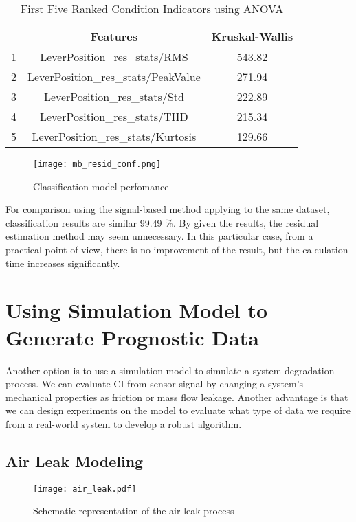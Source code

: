 \begin{table}[h!]
    \centering
    \begin{tabular}{|c|c|c|}
        \hline
          &        Features               & Kruskal-Wallis \\ \hline
        1 &   LeverPosition\_res\_stats/RMS	    & 543.82 \\ \hline  
        2 &   LeverPosition\_res\_stats/PeakValue	& 271.94 \\ \hline  
        3 &   LeverPosition\_res\_stats/Std	    & 222.89 \\ \hline  
        4 &   LeverPosition\_res\_stats/THD	    & 215.34 \\ \hline  
        5 &   LeverPosition\_res\_stats/Kurtosis	& 129.66 \\ \hline  
    \end{tabular}
    \caption{First Five Ranked Condition Indicators using ANOVA}
    \label{tab:resid_sorted_ci}
\end{table}

\begin{figure}[h!]
    \centering
    \texttt{[image: mb\_resid\_conf.png]}
    \caption{Classification model perfomance}
    \label{fig:mb_resid_conf}
\end{figure}

For comparison using the signal-based method applying to the same dataset,
classification results are similar 99.49 \%.
By given the results, the residual estimation method may seem unnecessary.
In this particular case, from a practical point of view, there is no
improvement of the result, but the calculation time increases
significantly. 


\section{Using Simulation Model to Generate Prognostic Data}\label{sec:mb_rul}
Another option is to use a simulation model to simulate a system degradation
process. We can evaluate CI from sensor signal by changing a system's
mechanical properties as friction or mass flow leakage.  Another advantage
is that we can design experiments on the model to evaluate what type of
data we require from a real-world system to develop a robust algorithm.

\subsection{Air Leak Modeling}
\begin{figure}[h!]
    \centering
    \texttt{[image: air\_leak.pdf]}
    \caption{Schematic representation of the air leak process}
    \label{fig:air_leak_scheme}
\end{figure}


